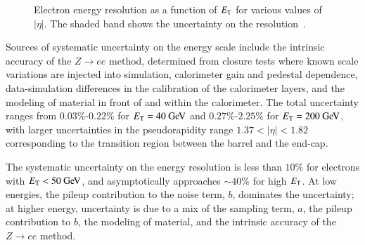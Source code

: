 \begin{figure}[htbp]
{	}
	\hfill
	\caption{Electron energy resolution as a function of $E_{\text{T}}$ for various values of $|\eta|$. The shaded band shows the uncertainty on the resolution~\cite{TheATLASCollaboration:2014gf}.}
	\label{fig:reco-el-EER}
\end{figure}


Sources of systematic uncertainty on the energy scale include the intrinsic accuracy of the $Z\rightarrow ee$ method, determined from closure tests where known scale variations are injected into simulation, calorimeter gain and pedestal dependence, data-simulation differences in the calibration of the calorimeter layers, and the modeling of material in front of and within the calorimeter. The total uncertainty ranges from $0.03\%$-$0.22$\% for $\Et=40 \GeV$ and $0.27\%$-$2.25$\% for $\Et = 200 \GeV$, with larger uncertainties in the pseudorapidity range $1.37<|\eta|<1.82$ corresponding to the transition region between the barrel and the end-cap. 

The systematic uncertainty on the energy resolution is less than $10\%$ for electrons with $\Et<50 \GeV$, and asymptotically approaches $\sim 40\%$ for high $E_{\mathrm{T}}$. At low energies, the pileup contribution to the noise term, $b$, dominates the uncertainty; at higher energy, uncertainty is due to a mix of the sampling term, $a$, the pileup contribution to $b$, the modeling of material, and the intrinsic accuracy of the $Z\rightarrow ee$ method.


